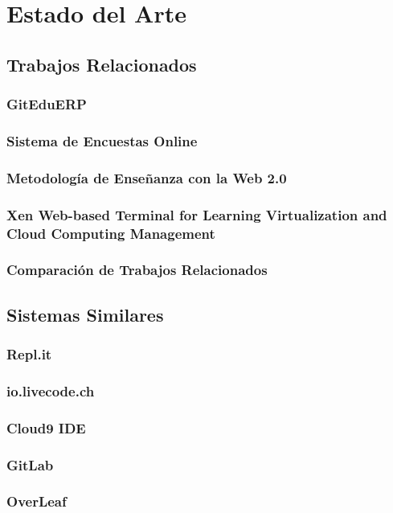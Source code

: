 
\chapter{Estado del Arte}
\label{capitulo2}

\section{Trabajos Relacionados}

\subsection{GitEduERP}
\subsection{Sistema de Encuestas Online}
\subsection{Metodología de Enseñanza con la Web 2.0}
\subsection{Xen Web-based Terminal for Learning Virtualization and Cloud Computing Management}
\subsection{Comparación de Trabajos Relacionados}

\section{Sistemas Similares}
\subsection{Repl.it}
\subsection{io.livecode.ch}
\subsection{Cloud9 IDE}
\subsection{GitLab}
\subsection{OverLeaf}
